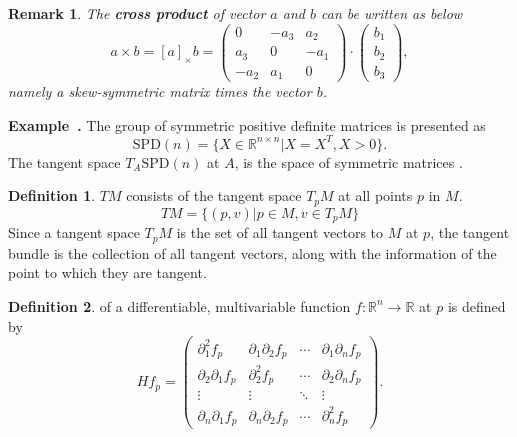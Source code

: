\documentclass[a4paper]{article}
\theoremstyle{definition}
\newtheorem{definition}{Definition}
\theoremstyle{plain}
\newtheorem{remark}{Remark}
\newenvironment{example}[1][]{\refstepcounter{example}\par\medskip
   \noindent \textbf{Example~\theexample. #1} \rmfamily}{\medskip}
\newcounter{example}{Example}
\begin{document}
\begin{remark}
The \textbf{cross product} of vector $a$ and $b$ can be written as below
\begin{equation*}
    a\times b=[a]_\times b=
    \begin{pmatrix}
        0 & -a_3 & a_2\\
        a_3 & 0 & -a_1\\
        -a_2 & a_1 & 0
    \end{pmatrix}\cdot
    \begin{pmatrix}
        b_1\\
        b_2\\
        b_3
    \end{pmatrix},
\end{equation*}
namely a skew-symmetric matrix times the vector $b$.
\end{remark}

\begin{example}
The group of symmetric positive definite matrices is presented as
\begin{equation*}
    \mathrm{SPD}(n)=\{X\in \mathbb{R}^{n×n}|X=X^T,X>0\}.
\end{equation*}
The tangent space $T_A\mathrm{SPD}(n)$ at $A$, is the space of symmetric matrices \cite{yger}.
\end{example}

\begin{definition}
 $TM$ consists of the tangent space $T_pM$ at all points $p$ in $M$. 
\begin{equation*}
     TM=\{(p,v)|p \in M,v \in T_pM\} 
\end{equation*}
Since a tangent space $T_pM$ is the set of all tangent vectors to $M$ at $p$, the tangent bundle is the collection of all tangent vectors, along with the information of the point to which they are tangent.
\end{definition}

\begin{definition}
 of a differentiable, multivariable function $f:\mathbb{R}^n\rightarrow\mathbb{R}$ at $p$ is defined by
\begin{equation*}
    Hf_p=
    \begin{pmatrix}
    \partial^2_1f_p & \partial_1\partial_2f_p & \cdots & \partial_1\partial_nf_p\\
    \partial_2\partial_1f_p & \partial^2_2f_p & \cdots & \partial_2\partial_nf_p\\
    \vdots & \vdots & \ddots & \vdots\\
    \partial_n\partial_1f_p & \partial_n\partial_2f_p & \cdots & \partial^2_nf_p
    \end{pmatrix}.
\end{equation*}
\end{definition}
\end{document}

